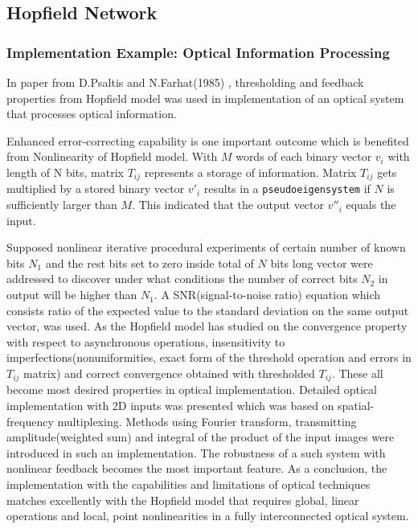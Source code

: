 \subsection{Hopfield Network}

\subsubsection{Implementation Example: Optical Information Processing}
In paper from D.Psaltis and N.Farhat(1985) \cite{optical_processing}, thresholding and feedback properties from Hopfield model was used in implementation of an optical system that processes optical information.

Enhanced error-correcting capability is one important outcome which is benefited from Nonlinearity of Hopfield model. With $M$ words of each binary vector $v_i$ with length of N bits, matrix $T_{ij}$ represents a storage of information. Matrix $T_{ij}$ gets multiplied by a stored binary vector $v'_i$ results in a \texttt{pseudoeigensystem} if $N$ is sufficiently larger than $M$. This indicated that the output vector $v''_i$ equals the input.

Supposed nonlinear iterative procedural experiments of certain number of known bits $N_1$ and the rest bits set to zero inside total of $N$ bits long vector were addressed to discover under what conditions the number of correct bits $N_2$ in output will be higher than $N_1$. A SNR(signal-to-noise ratio) equation which consists ratio of the expected value to the standard deviation on the same output vector, was used. As the Hopfield model has studied on the convergence property with respect to asynchronous operations, insensitivity to imperfections(nonuniformities, exact form of the threshold operation and errors in $T_{ij}$ matrix) and correct convergence obtained with thresholded $T_{ij}$. These all become most desired properties in optical implementation. Detailed optical implementation with 2D inputs was presented which was based on spatial-frequency multiplexing. Methods using Fourier transform, transmitting amplitude(weighted sum) and integral of the product of the input images were introduced in such an implementation. The robustness of a such system with nonlinear feedback becomes the most important feature.
As a conclusion, the implementation with the capabilities and limitations of optical techniques matches excellently with the Hopfield model that requires global, linear operations and local, point nonlinearities in a fully interconnected optical system.

